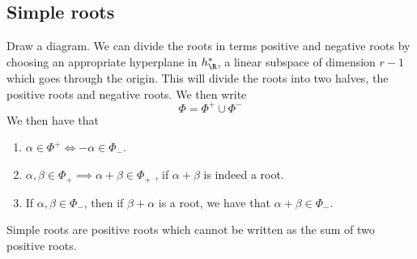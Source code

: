 \subsection{Simple roots}
Draw a diagram. 
We can divide the roots in terms positive and 
negative roots by choosing an 
appropriate hyperplane in $ \subalg ^ * _{ \R } $, a linear 
subspace of dimension $ r - 1$ which 
goes through the origin. 
This will divide the roots into two halves, 
the positive roots and negative roots. 
We then write 
\[
 \Phi = \Phi ^ + \cup \Phi ^ -
\] We then have that 
\begin{enumerate}
	\item $ \alpha \in \Phi ^ +  \iff  - \alpha \in \Phi _ - $. 
	\item $ \alpha , \beta \in \Phi _ +  \implies 
		\alpha + \beta \in \Phi _ + $ , 
		if $ \alpha +  \beta $ is indeed a root.
	\item If $ \alpha , \beta \in \Phi _ - $, 
		then if  $ \beta + \alpha $ is a root, 
		we have that $ \alpha + \beta \in \Phi  _- $. 
\end{enumerate}
Simple roots are positive roots which cannot be written 
as the sum of two positive roots. 
\pagebreak 
